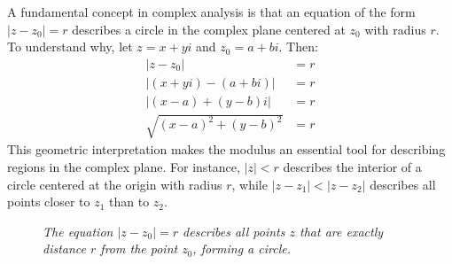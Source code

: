 \noindent A fundamental concept in complex analysis is that an equation of the form $|z - z_0| = r$ describes a circle in the complex plane centered at $z_0$ with radius $r$. To understand why, let $z = x + yi$ and $z_0 = a + bi$. Then:
\begin{align*}
|z - z_0| &= r \\
|(x + yi) - (a + bi)| &= r \\
|(x-a) + (y-b)i| &= r \\
\sqrt{(x-a)^2 + (y-b)^2} &= r
\end{align*}
\noindent This geometric interpretation makes the modulus an essential tool for describing regions in the complex plane. For instance, $|z| < r$ describes the interior of a circle centered at the origin with radius $r$, while $|z-z_1| < |z-z_2|$ describes all points closer to $z_1$ than to $z_2$.


\begin{figure}[H]
\centering
{}
\caption{\textit{The equation $|z-z_0| = r$ describes all points $z$ that are exactly distance $r$ from the point $z_0$, forming a circle.}}
\label{fig:modulus-circle}
\end{figure}

